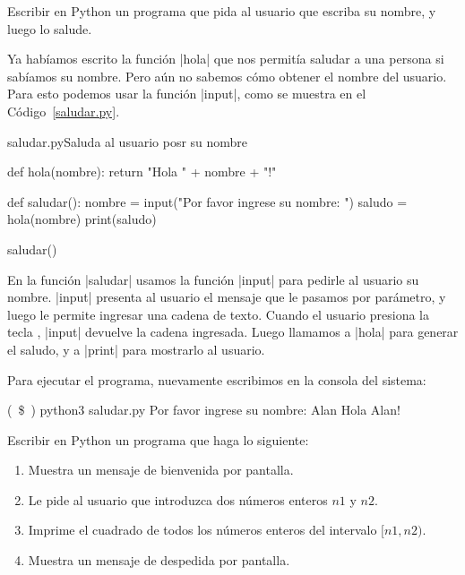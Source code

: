 \begin{problema}
Escribir en Python un programa que pida al usuario que escriba su nombre, y
luego lo salude.

\begin{solucion}
Ya habíamos escrito la función |hola| que nos permitía saludar a una
persona si sabíamos su nombre. Pero aún no sabemos cómo obtener el nombre del
usuario. Para esto podemos usar la función |input|, como se muestra en el
Código~\ref{saludar.py}.

\begin{codigo}{saludar.py}{Saluda al usuario posr su nombre}
\label{saludar.py}
\begin{codigo-python}
def hola(nombre):
    return "Hola " + nombre + "!"

def saludar():
    nombre = input("Por favor ingrese su nombre: ")
    saludo = hola(nombre)
    print(saludo)

saludar()
\end{codigo-python}
\end{codigo}
\end{solucion}
\end{problema}

En la función |saludar| usamos la función |input| para pedirle al usuario su
nombre. |input| presenta al usuario el mensaje que le pasamos por parámetro,
y luego le permite ingresar una cadena de texto. Cuando el usuario presiona la
tecla , |input| devuelve la cadena ingresada. Luego llamamos a
|hola| para generar el saludo, y a |print| para mostrarlo al usuario.

Para ejecutar el programa, nuevamente escribimos en la consola del sistema:

\begin{codigo-nohl-sn}
(~\$~) python3 saludar.py
Por favor ingrese su nombre: Alan
Hola Alan!
\end{codigo-nohl-sn}

\begin{problema}
Escribir en Python un programa que haga lo siguiente:

\begin{enumerate}
\item Muestra un mensaje de bienvenida por pantalla.
\item Le pide al usuario que introduzca dos números enteros $n1$ y $n2$.
\item Imprime el cuadrado de todos los números enteros del intervalo $[n1, n2)$.
\item Muestra un mensaje de despedida por pantalla.
\end{enumerate}
\end{problema}

